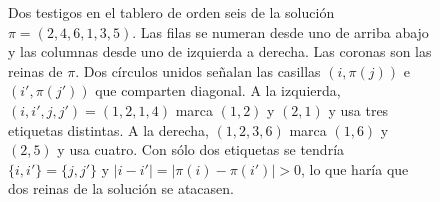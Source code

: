 \begin{figure}[htbp]
\centering
{}
\caption{Dos testigos en el tablero de orden seis de la solución $\pi=(2,4,6,1,3,5)$. Las filas se
numeran desde uno de arriba abajo y las columnas desde uno de izquierda a derecha. Las coronas son las
reinas de $\pi$. Dos círculos unidos señalan las casillas $(i,\pi(j))$ e $(i',\pi(j'))$ que comparten
diagonal. A la izquierda, $(i,i',j,j')=(1,2,1,4)$ marca $(1,2)$ y $(2,1)$ y usa tres etiquetas
distintas. A la derecha, $(1,2,3,6)$ marca $(1,6)$ y $(2,5)$ y usa cuatro. Con sólo dos etiquetas se
tendría $\{i,i'\}=\{j,j'\}$ y $|i-i'|=|\pi(i)-\pi(i')|>0$, lo que haría que dos reinas de la solución
se atacasen.}\label{fig:testigos}
\end{figure}
